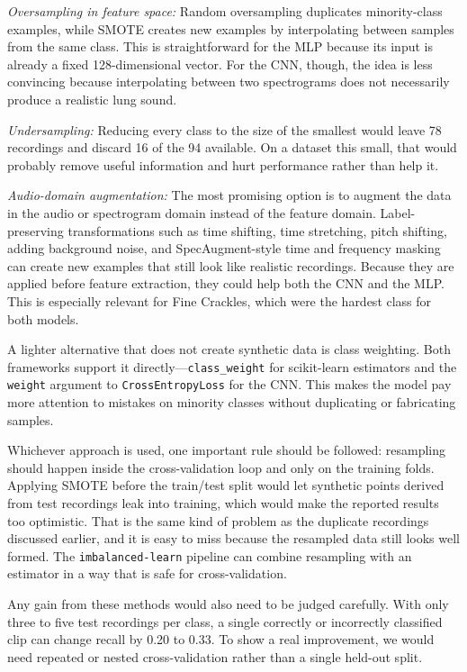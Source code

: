 \documentclass[conference]{IEEEtran}
\begin{document}
\textit{Oversampling in feature space:} Random oversampling duplicates
minority-class examples, while SMOTE \cite{b8} creates new examples by
interpolating between samples from the same class. This is straightforward for
the MLP because its input is already a fixed 128-dimensional vector. For the CNN,
though, the idea is less convincing because interpolating between two
spectrograms does not necessarily produce a realistic lung sound.

\textit{Undersampling:} Reducing every class to the size of the smallest would
leave 78 recordings and discard 16 of the 94 available. On a dataset this small,
that would probably remove useful information and hurt performance rather than
help it.

\textit{Audio-domain augmentation:} The most promising option is to augment the
data in the audio or spectrogram domain instead of the feature domain.
Label-preserving transformations such as time shifting, time stretching, pitch
shifting, adding background noise, and SpecAugment-style time and frequency
masking \cite{b10} can create new examples that still look like realistic
recordings. Because they are applied before feature extraction, they could help
both the CNN and the MLP. This is especially relevant for Fine Crackles, which
were the hardest class for both models.

A lighter alternative that does not create synthetic data is class weighting.
Both frameworks support it directly---\texttt{class\_weight} for scikit-learn
estimators and the \texttt{weight} argument to \texttt{CrossEntropyLoss} for the
CNN. This makes the model pay more attention to mistakes on minority classes
without duplicating or fabricating samples.

Whichever approach is used, one important rule should be followed: resampling
should happen inside the cross-validation loop and only on the training folds.
Applying SMOTE before the train/test split would let synthetic points derived
from test recordings leak into training, which would make the reported results
too optimistic. That is the same kind of problem as the duplicate recordings
discussed earlier, and it is easy to miss because the resampled data still looks
well formed. The \texttt{imbalanced-learn} pipeline \cite{b9} can combine
resampling with an estimator in a way that is safe for cross-validation.

Any gain from these methods would also need to be judged carefully. With only
three to five test recordings per class, a single correctly or incorrectly
classified clip can change recall by 0.20 to 0.33. To show a real improvement,
we would need repeated or nested cross-validation rather than a single held-out
split.
\end{document}

